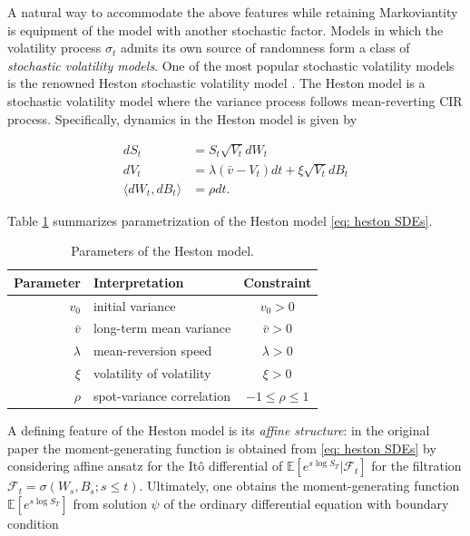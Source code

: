 \documentclass[12pt,twoside]{article}
\theoremstyle{plain}
\theoremstyle{plain}
\theoremstyle{definition}
\theoremstyle{remark}
\numberwithin{equation}{section}
\begin{document}
A natural way to accommodate the above features while retaining Markoviantity is equipment of the model with another stochastic factor. Models in which the volatility process $\sigma_t$ admits its own source of randomness form a class of \textit{stochastic volatility models}. One of the most popular stochastic volatility models is the renowned Heston stochastic volatility model \cite{H93}. The Heston model is a stochastic volatility model where the variance process follows mean-reverting CIR process. Specifically, dynamics in the Heston model is given by

\begin{equation}
\label{eq: heston SDEs}
\begin{aligned}
d S_{t}&=S_{t} \sqrt{V_{t}} d W_{t} \\[5pt]
d V_{t}&=\lambda\left(\bar v-V_{t}\right) d t+\xi \sqrt{V_{t}} d B_{t} \\[5pt]
\langle dW_t, dB_t\rangle &= \rho dt.
\end{aligned}
\end{equation}

\vspace{10pt}

Table \ref{table: heston parameters} summarizes parametrization of the Heston model \eqref{eq: heston SDEs}.

\vspace{10pt}

\begin{table}[H]
\centering
\begin{tabular}{r l c}
    \hline
    Parameter & Interpretation & Constraint \\
    \hline\hline
    $v_0$ & initial variance & $v_0 > 0$ \\
    $\bar v$ & long-term mean variance & $\bar v > 0$ \\
    $\lambda$ & mean-reversion speed & $\lambda > 0$ \\
    $\xi$ & volatility of volatility & $\xi > 0$ \\
    $\rho$ & spot-variance correlation & $-1 \leq \rho \leq 1$ \\
    \hline
\end{tabular}
\caption{Parameters of the Heston model.}
\label{table: heston parameters}
\end{table}

\vspace{20pt}

\newpage

A defining feature of the Heston model is its \emph{affine structure}: in the original paper \cite{H93} the moment-generating function is obtained from \eqref{eq: heston SDEs} by considering affine ansatz for the Itô differential of $\mathbb{E}\left[e^{s \log S_{T}} | \mathcal{F}_{t}\right]$ for the filtration $\mathcal{F}_{t}=\sigma\left(W_{s}, B_{s} ; s \leq t\right)$. Ultimately, one obtains the moment-generating function $\mathbb{E}\left[e^{s \log S_{T}}\right]$ from solution $\psi$ of the ordinary differential equation with boundary condition
\end{document}
